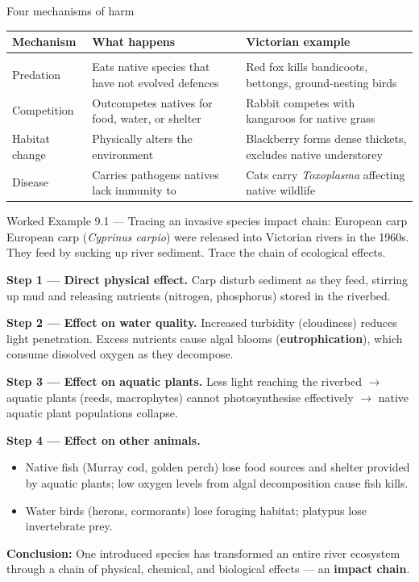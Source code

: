 \documentclass[11pt,a4paper]{article}
\begin{document}
\begin{infobox}{Four mechanisms of harm}
\begin{tabular}{@{}L{3cm} L{5cm} L{6.5cm}@{}}
  \textbf{Mechanism} & \textbf{What happens} & \textbf{Victorian example} \\[2pt]
  \hline\\[-6pt]
  Predation    & Eats native species that have not evolved defences & Red fox kills bandicoots, bettongs, ground-nesting birds \\[4pt]
  Competition  & Outcompetes natives for food, water, or shelter & Rabbit competes with kangaroos for native grass \\[4pt]
  Habitat change & Physically alters the environment & Blackberry forms dense thickets, excludes native understorey \\[4pt]
  Disease      & Carries pathogens natives lack immunity to & Cats carry \textit{Toxoplasma} affecting native wildlife \\[4pt]
\end{tabular}
\end{infobox}
\newpage
\begin{workedex}{Worked Example 9.1 --- Tracing an invasive species impact chain: European carp}
European carp (\textit{Cyprinus carpio}) were released into Victorian rivers in the 1960s. They feed by sucking up river sediment. Trace the chain of ecological effects.

\medskip
\textbf{Step 1 --- Direct physical effect.}
Carp disturb sediment as they feed, stirring up mud and releasing nutrients (nitrogen, phosphorus) stored in the riverbed.

\medskip
\textbf{Step 2 --- Effect on water quality.}
Increased turbidity (cloudiness) reduces light penetration. Excess nutrients cause algal blooms (\textbf{eutrophication}), which consume dissolved oxygen as they decompose.

\medskip
\textbf{Step 3 --- Effect on aquatic plants.}
Less light reaching the riverbed $\rightarrow$ aquatic plants (reeds, macrophytes) cannot photosynthesise effectively $\rightarrow$ native aquatic plant populations collapse.

\medskip
\textbf{Step 4 --- Effect on other animals.}
\begin{itemize}[itemsep=2pt]
  \item Native fish (Murray cod, golden perch) lose food sources and shelter provided by aquatic plants; low oxygen levels from algal decomposition cause fish kills.
  \item Water birds (herons, cormorants) lose foraging habitat; platypus lose invertebrate prey.
\end{itemize}

\medskip
\textbf{Conclusion:} One introduced species has transformed an entire river ecosystem through a chain of physical, chemical, and biological effects --- an \textbf{impact chain}.
\end{workedex}
\end{document}
